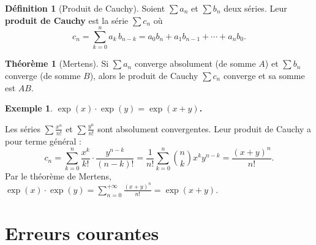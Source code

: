 \documentclass[12pt,a4paper,openany]{book}
\theoremstyle{definition}
\newtheorem{definition}{Définition}[chapter]
\newtheorem{theoreme}{Théorème}[chapter]
\newtheorem{exemple}{Exemple}[chapter]
\begin{document}
\begin{definition}[Produit de Cauchy]\label{def:produit-cauchy}
  Soient $\sum a_n$ et $\sum b_n$ deux séries. Leur \textbf{produit de Cauchy} est la
  série $\sum c_n$ où
  \[
    c_n = \sum_{k=0}^{n} a_k \, b_{n-k} = a_0 b_n + a_1 b_{n-1} + \cdots + a_n b_0.
  \]
\end{definition}

\begin{theoreme}[Mertens]\label{thm:mertens}
  Si $\sum a_n$ converge absolument (de somme $A$) et $\sum b_n$ converge (de somme $B$),
  alors le produit de Cauchy $\sum c_n$ converge et sa somme est $AB$.
\end{theoreme}

\begin{exemple}\label{ex:exp-produit}
  \textbf{$\exp(x) \cdot \exp(y) = \exp(x+y)$.}

  Les séries $\sum \frac{x^n}{n!}$ et $\sum \frac{y^n}{n!}$ sont absolument convergentes.
  Leur produit de Cauchy a pour terme général :
  \[
    c_n = \sum_{k=0}^{n} \frac{x^k}{k!} \cdot \frac{y^{n-k}}{(n-k)!}
        = \frac{1}{n!} \sum_{k=0}^{n} \binom{n}{k} x^k y^{n-k}
        = \frac{(x+y)^n}{n!}.
  \]
  Par le théorème de Mertens, $\exp(x) \cdot \exp(y) = \sum_{n=0}^{+\infty} \frac{(x+y)^n}{n!} = \exp(x+y)$.
\end{exemple}

\section{Erreurs courantes}\label{sec:series:erreurs}
\end{document}
